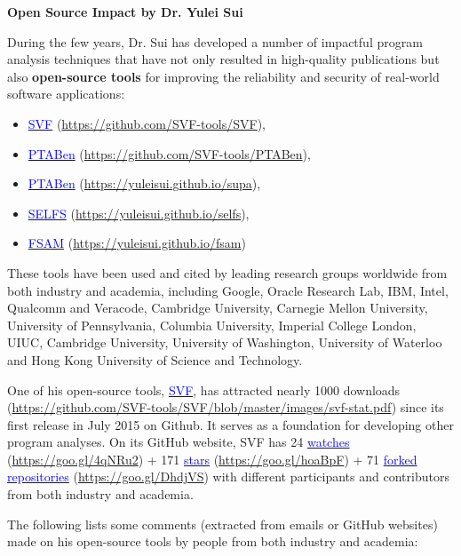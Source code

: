 \documentclass[12pt]{article}
\begin{document}
\centerline{\Large \bf Open Source Impact by Dr. Yulei Sui}
\bigskip
\bigskip

During the few years, Dr. Sui has 
developed a number of impactful 
program analysis techniques that have not only 
resulted in high-quality publications but also 
\textbf{open-source tools} for improving the reliability
and security of real-world software applications:
\begin{itemize}
\setlength\itemsep{-0.2em}
\item \href{https://github.com/SVF-tools/SVF}{\textcolor{blue}{SVF}} (\url{https://github.com/SVF-tools/SVF}), 
\item \href{https://github.com/SVF-tools/PTABen}{\textcolor{blue}{PTABen}} (\url{https://github.com/SVF-tools/PTABen}), 
\item \href{https://yuleisui.github.io/supa}{\textcolor{blue}{PTABen}} (\url{https://yuleisui.github.io/supa}), 
\item \href{https://yuleisui.github.io/selfs}{\textcolor{blue}{SELFS}} (\url{https://yuleisui.github.io/selfs}), 
\item \href{https://yuleisui.github.io/fsam}{\textcolor{blue}{FSAM}} (\url{https://yuleisui.github.io/fsam}) 
\end{itemize}
These tools have been used and cited by leading research groups worldwide from both industry and academia, including Google, Oracle Research Lab, IBM, Intel, Qualcomm and Veracode, Cambridge University, Carnegie Mellon University, University of Pennsylvania, Columbia University, Imperial College London, UIUC, Cambridge University, University of Washington, University of Waterloo and Hong Kong University of Science and Technology.


One of his open-source tools, \href{https://github.com/SVF-tools/SVF}{\textcolor{blue}{SVF}}, has attracted nearly 1000 downloads (\url{https://github.com/SVF-tools/SVF/blob/master/images/svf-stat.pdf}) since its first release in July 2015 on Github. 
It serves as a foundation for developing other
program analyses. On its GitHub website, SVF  has 24 \href{https://goo.gl/4qNRu2}{\textcolor{blue}{watches}} (\url{https://goo.gl/4qNRu2}) + 171 \href{https://goo.gl/hoaBpF}{\textcolor{blue}{stars}} (\url{https://goo.gl/hoaBpF}) + 71 \href{https://goo.gl/w1gjKB}{\textcolor{blue}{forked repositories}} (\url{https://goo.gl/DhdjVS}) with different participants and contributors from both industry and academia.

The following lists some comments (extracted from emails or GitHub websites) made on his open-source tools by people from both industry and academia:
\end{document}
